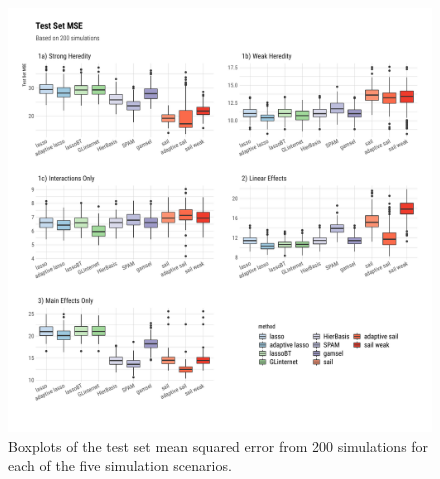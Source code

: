 \documentclass[useAMS,usenatbib,referee]{biom}
\begin{document}
\begin{figure}
	
	{\centering \includegraphics[width=1\linewidth]{../figure/plot-mse-sim-1} 
		
	}
	
	\caption[Boxplots of the test set mean squared error from 200 simulations for each of the five simulation scenarios]{Boxplots of the test set mean squared error from 200 simulations for each of the five simulation scenarios.}\label{fig:plot-mse-sim}
\end{figure}




%
%
%
\end{document}
